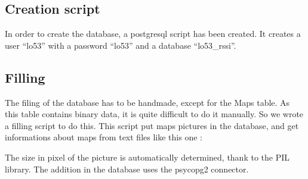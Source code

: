        \subsection{Creation script}

In order to create the database, a postgresql script has been created. It
creates a user ``lo53'' with a password ``lo53'' and a database ``lo53\_rssi''.

        \subsection{Filling}

The filing of the database has to be handmade, except for the Maps table. As
this table contains binary data, it is quite difficult to do it manually. So we
wrote a filling script to do this. This script put maps pictures in the
database, and get informations about maps from text files like this one :



The size in pixel of the picture is automatically determined, thank to the PIL
library. The addition in the database uses the psycopg2 connector.
